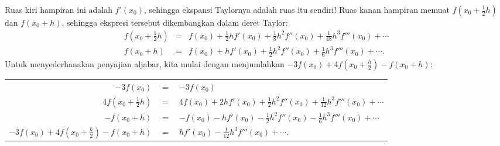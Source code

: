 \begin{description}
Ruas kiri hampiran ini adalah $f'(x_{0})$, sehingga ekspansi Taylornya
adalah ruas itu sendiri! Ruas kanan hampiran memuat $f(x_{0}+\frac{1}{2}h)$
dan $f(x_{0}+h)$, sehingga ekspresi tersebut dikembangkan dalam deret
Taylor:
\begin{eqnarray*}
f\left(x_{0}+\frac{1}{2}h\right) & = & f(x_{0})+\frac{1}{2}hf'(x_{0})+\frac{1}{8}h^{2}f''(x_{0})+\frac{1}{48}h^{3}f'''(x_{0})+\cdots\\
f\left(x_{0}+h\right) & = & f(x_{0})+hf'(x_{0})+\frac{1}{2}h^{2}f''(x_{0})+\frac{1}{6}h^{3}f'''(x_{0})+\cdots.
\end{eqnarray*}
Untuk menyederhanakan penyajian aljabar, kita mulai dengan menjumlahkan
$-3f(x_{0})+4f(x_{0}+\frac{h}{2})-f(x_{0}+h)$:

\begin{center}
\begin{tabular}{rcl}
$-3f(x_{0})$ & $=$ & $-3f(x_{0})$\tabularnewline
$4f(x_{0}+\frac{1}{2}h)$ & $=$ & $4f(x_{0})+2hf'(x_{0})+\frac{1}{2}h^{2}f''(x_{0})+\frac{1}{12}h^{3}f'''(x_{0})+\cdots$\tabularnewline
$-f(x_{0}+h)$ & $=$ & $-f(x_{0})-hf'(x_{0})-\frac{1}{2}h^{2}f''(x_{0})-\frac{1}{6}h^{3}f'''(x_{0})+\cdots$\tabularnewline
\hline 
$-3f(x_{0})+4f(x_{0}+\frac{h}{2})-f(x_{0}+h)$ & $=$ & $hf'(x_{0})-\frac{1}{12}h^{3}f'''(x_{0})+\cdots$.\tabularnewline
\end{tabular}
\par\end{center}


\end{description}

